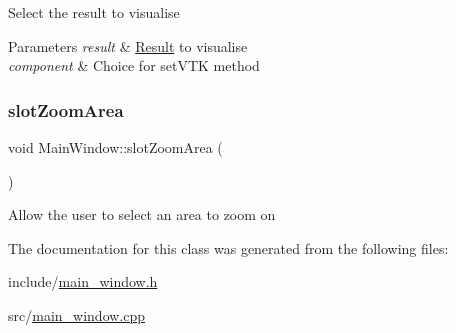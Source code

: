 Select the result to visualise 
\begin{DoxyParams}{Parameters}
{\em result} & \hyperlink{classResult}{Result} to visualise \\
\hline
{\em component} & Choice for set\+V\+TK method \\
\hline
\end{DoxyParams}
\mbox{\label{classMainWindow_ab4be74f01161ac57ddf86f32c60137d3}} 
\subsubsection{\texorpdfstring{slot\+Zoom\+Area}{slotZoomArea}}
{\footnotesize\ttfamily void Main\+Window\+::slot\+Zoom\+Area (\begin{DoxyParamCaption}{ }\end{DoxyParamCaption})\hspace{0.3cm}{\ttfamily [slot]}}

Allow the user to select an area to zoom on 

The documentation for this class was generated from the following files\+:\begin{DoxyCompactItemize}
\item 
include/\hyperlink{main__window_8h}{main\+\_\+window.\+h}\item 
src/\hyperlink{main__window_8cpp}{main\+\_\+window.\+cpp}\end{DoxyCompactItemize}
